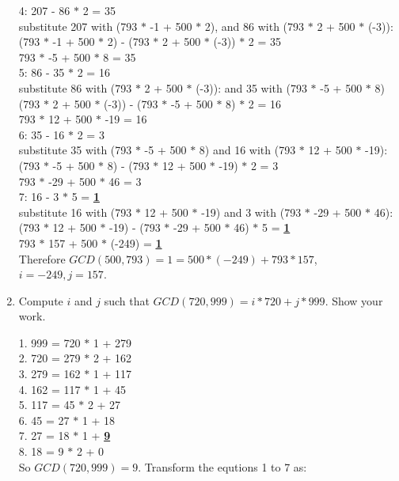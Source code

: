 \documentclass[11pt]{article}
\begin{document}
\begin{enumerate}
4: 207 - 86  $*$ 2  = 35\\
substitute 207 with (793 $*$ -1 + 500 $*$ 2), and 86 with (793 $*$ 2 +
500 $*$ (-3)):\\
(793 $*$ -1 + 500 $*$ 2) - (793 $*$ 2 + 500 $*$ (-3)) $*$ 2 = 35\\
793 $*$ -5 + 500 $*$ 8 = 35\\

5: 86  - 35  $*$ 2  = 16\\
substitute 86 with (793 $*$ 2 + 500 $*$ (-3)): and 35 with (793 $*$ -5
+ 500 $*$ 8)\\
(793 $*$ 2 + 500 $*$ (-3)) - (793 $*$ -5 + 500 $*$ 8) $*$ 2 = 16\\
793 $*$ 12 + 500 $*$ -19 = 16\\

6: 35  - 16  $*$ 2  = 3\\
substitute 35 with (793 $*$ -5 + 500 $*$ 8) and 16 with (793 $*$ 12 +
500 $*$ -19):\\
(793 $*$ -5 + 500 $*$ 8) - (793 $*$ 12 + 500 $*$ -19) $*$ 2 = 3\\
793 $*$ -29 + 500 $*$ 46 = 3\\

7: 16  - 3   $*$ 5 = \underline{\textbf{1}}\\
substitute 16 with (793 $*$ 12 + 500 $*$ -19) and 3 with (793 $*$ -29
+ 500 $*$ 46):\\
(793 $*$ 12 + 500 $*$ -19) - (793 $*$ -29 + 500 $*$ 46) $*$ 5 =
\underline{\textbf{1}}\\ 
793 $*$ 157 + 500 $*$ (-249) = \underline{\textbf{1}}\\

Therefore $GCD(500, 793) = 1 = 500 * (-249) + 793 * 157$, $i = -249, j
= 157$.

\item Compute $i$ and $j$ such that $GCD(720, 999) = i * 720 + j *
  999$. Show your work.

1. 999 = 720 $*$ 1 + 279\\
2. 720 = 279 $*$ 2 + 162\\
3. 279 = 162 $*$ 1 + 117\\
4. 162 = 117 $*$ 1 + 45\\
5. 117 = 45 $*$ 2 + 27\\
6. 45 = 27 $*$ 1 + 18\\
7. 27 = 18 $*$ 1 + \underline{\textbf{9}}\\
8. 18 = 9 $*$ 2 + 0\\

So $GCD(720, 999) = 9$.
Transform the equtions 1 to 7 as:


\end{enumerate}
\end{document}
